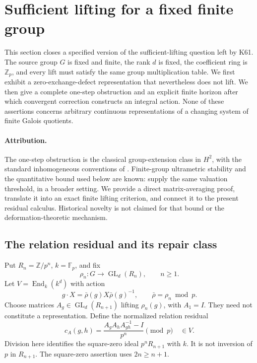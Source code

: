 \section{Sufficient lifting for a fixed finite group}\label{sec:finite-lifting}

This section closes a specified version of the sufficient-lifting question left by K61. The source group $G$ is fixed and finite, the rank $d$ is fixed, the coefficient ring is $\mathbb Z_p$, and every lift must satisfy the same group multiplication table. We first exhibit a zero-exchange-defect representation that nevertheless does not lift. We then give a complete one-step obstruction and an explicit finite horizon after which convergent correction constructs an integral action. None of these assertions concerns arbitrary continuous representations of a changing system of finite Galois quotients.

\paragraph{Attribution.}
The one-step obstruction is the classical group-extension class in $H^2$, with the standard inhomogeneous conventions of \cite[Chapter II, 1.17--1.19]{MilneCFT2020}. Finite-group ultrametric stability and the quantitative bound used below are known: \cite[Lemma 7.3, Proposition 7.4, Example 7.5]{FournierFacio2026} supply the same valuation threshold, in a broader setting. We provide a direct matrix-averaging proof, translate it into an exact finite lifting criterion, and connect it to the present residual calculus. Historical novelty is not claimed for that bound or the deformation-theoretic mechanism.

\subsection{The relation residual and its repair class}

Put $R_n=\mathbb Z/p^n$, $k=\mathbb F_p$, and fix
\[
 \rho_n:G\longrightarrow\operatorname{GL}_d(R_n),\qquad n\geq1.
\]
Let $V=\operatorname{End}_k(k^d)$ with action
\[
 g\cdot X=\bar\rho(g)X\bar\rho(g)^{-1},
 \qquad \bar\rho=\rho_n\bmod p.
\]
Choose matrices $A_g\in\operatorname{GL}_d(R_{n+1})$ lifting $\rho_n(g)$, with $A_1=I$. They need not constitute a representation. Define the normalized relation residual
\[
 c_A(g,h)=\frac{A_gA_hA_{gh}^{-1}-I}{p^n}\pmod p\quad\in V.
\]
Division here identifies the square-zero ideal $p^nR_{n+1}$ with $k$. It is not inversion of $p$ in $R_{n+1}$. The square-zero assertion uses $2n\geq n+1$.

